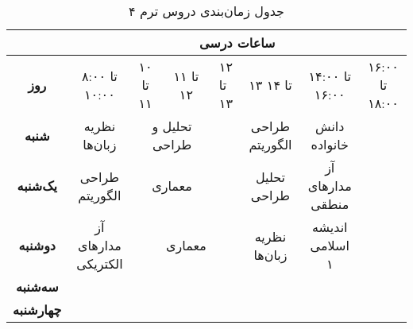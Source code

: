 \documentclass{article}
\begin{document}
	
	\begin{sidewaystable}[h]
		\begin{center}	
			\caption{جدول زمان‌بندی دروس ترم ۴}	
			\begin{tabular}{|c|c|c|c|c|p{1.5cm}|c|c|c|c|c|}
				\cline{2-11}
				\multicolumn{1}{c}{}
				& \multicolumn{10}{|c|}{\textbf{ساعات درسی}} \\ \hline
				\textbf{روز} &
				\multicolumn{2}{|c|}{۸:۰۰ تا ۱۰:۰۰} &
				۱۰ تا ۱۱ & ۱۱ تا ۱۲ &
				\centering ۱۲ تا ۱۳
				& ۱۳ تا ۱۴ &
				\multicolumn{2}{|c|}{۱۴:۰۰ تا ۱۶:۰۰} &
				\multicolumn{2}{|c|}{۱۶:۰۰ تا ۱۸:۰۰} \\
				\hline
				\hline
				
				\textbf{شنبه} &
				\multicolumn{2}{|c|}{نظریه زبان‌ها} &
				\multicolumn{2}{|c|}{تحلیل و طراحی} &
				& طراحی الگوریتم &
				\multicolumn{2}{|c|}{دانش خانواده} &
				\multicolumn{2}{|c|}{} \\
				\hline
				
				\textbf{یک‌شنبه} &
				\multicolumn{2}{|c|}{طراحی الگوریتم} &
				\multicolumn{2}{|c|}{معماری} &
				& تحلیل طراحی &
				\multicolumn{2}{|c|}{آز مدار‌های منطقی} &
				\multicolumn{2}{|c|}{} \\
				\hline
				\textbf{دوشنبه} &
				\multicolumn{2}{|c|}{آز مدار‌های الکتریکی} &
				& معماری &
				& نظریه زبان‌ها &
				\multicolumn{2}{|c|}{اندیشه اسلامی ۱} &
				\multicolumn{2}{|c|}{} \\
				\hline
				
				\textbf{سه‌شنبه} &
				\multicolumn{2}{|c|}{} &
				\multicolumn{2}{|c|}{} &
				\multicolumn{2}{|c|}{} &
				\multicolumn{2}{|c|}{} &
				\multicolumn{2}{|c|}{} \\
				\hline
				
				\textbf{چهارشنبه} &
				\multicolumn{2}{|c|}{} &
				\multicolumn{2}{|c|}{} &
				\multicolumn{2}{|c|}{} &
				\multicolumn{2}{|c|}{} &
				\multicolumn{2}{|c|}{} \\
				\hline
			\end{tabular}
		\end{center}
	\end{sidewaystable}
\end{document}
